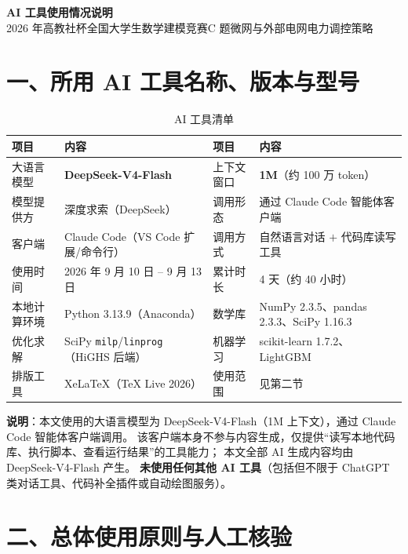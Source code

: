 \documentclass[11pt,a4paper,fontset=fandol]{ctexart}
\begin{document}
\begin{center}
  {\LARGE\bfseries AI 工具使用情况说明}\\[4pt]
  {\small 2026 年高教社杯全国大学生数学建模竞赛\quad C 题\quad 微网与外部电网电力调控策略}
\end{center}

\vspace{2pt}

\section*{一、所用 AI 工具名称、版本与型号}

\begin{table}[htbp]
\centering
\caption{AI 工具清单}
\label{tab:tool}
\small
\begin{tabularx}{\textwidth}{@{}p{2.2cm}p{3.9cm}p{2.5cm}X@{}}
\toprule
项目 & 内容 & 项目 & 内容 \\
\midrule
大语言模型 & \textbf{DeepSeek-V4-Flash} & 上下文窗口 & \textbf{1M}（约 100 万 token） \\
模型提供方 & 深度求索（DeepSeek） & 调用形态 & 通过 Claude Code 智能体客户端 \\
客户端 & Claude Code（VS Code 扩展/命令行） & 调用方式 & 自然语言对话 $+$ 代码库读写工具 \\
使用时间 & 2026 年 9 月 10 日 -- 9 月 13 日 & 累计时长 & 4 天（约 40 小时） \\
本地计算环境 & Python 3.13.9（Anaconda） & 数学库 & NumPy 2.3.5、pandas 2.3.3、SciPy 1.16.3 \\
优化求解 & SciPy \texttt{milp}/\texttt{linprog}（HiGHS 后端） & 机器学习 & scikit-learn 1.7.2、LightGBM \\
排版工具 & XeLaTeX（TeX Live 2026） & 使用范围 & 见第二节 \\
\bottomrule
\end{tabularx}
\end{table}

\textbf{说明}：本文使用的大语言模型为 DeepSeek-V4-Flash（1M 上下文），通过 Claude Code 智能体客户端调用。
该客户端本身不参与内容生成，仅提供“读写本地代码库、执行脚本、查看运行结果”的工具能力；
本文全部 AI 生成内容均由 DeepSeek-V4-Flash 产生。
\textbf{未使用任何其他 AI 工具}（包括但不限于 ChatGPT 类对话工具、代码补全插件或自动绘图服务）。

\section*{二、总体使用原则与人工核验}
\end{document}
